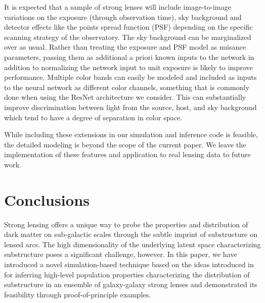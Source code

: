 \documentclass[twocolumn]{aastex62}
\begin{document}
It is expected that a sample of strong lenses will include image-to-image variations on the exposure (through observation time), sky background and detector effects like the points spread function (PSF) depending on the specific scanning strategy of the observatory. The sky background can be marginalized over as usual. Rather than treating the exposure and PSF model as nuisance parameters, passing them as additional a priori known inputs to the network in addition to normalizing the network input to unit exposure is likely to improve performance. Multiple color bands can easily be modeled and included as inputs to the neural network as different color channels, something that is commonly done when using the ResNet architecture we consider. This can substantially improve discrimination between light from the source, host, and sky background which tend to have a degree of separation in color space.

While including these extensions in our simulation and inference code is feasible, the detailed modeling is beyond the scope of the current paper. We leave the implementation of these features and application to real lensing data to future work.

\section{Conclusions}
\label{sec:conclusions}

Strong lensing offers a unique way to probe the properties and distribution of dark matter on sub-galactic scales through the subtle imprint of substructure on lensed arcs. The high dimensionality of the underlying latent space characterizing substructure poses a significant challenge, however. In this paper, we have introduced a novel simulation-based technique based on the ideas introduced in~\citet{1805.00013,1805.00020,1805.12244,Stoye:2018ovl} for inferring high-level population properties characterizing the distribution of substructure in an ensemble of galaxy-galaxy strong lenses and demonstrated its feasibility through proof-of-principle examples.
\end{document}

